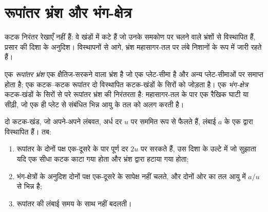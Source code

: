 \section{रूपांतर भ्रंश और भंग-क्षेत्र}

कटक निरंतर रेखाएँ नहीं हैं: वे खंडों में कटे हैं जो उनके समकोण पर चलने वाले भ्रंशों से विस्थापित हैं, प्रसार की दिशा के अनुदिश। विस्थापनों से आगे, भ्रंश महासागर-तल पर लंबे निशानों के रूप में जारी रहते हैं।

\begin{definition}[रूपांतर भ्रंश, भंग-क्षेत्र]\label{def:b1:rifts-ridges-margins:transform}
एक \emph{रूपांतर भ्रंश} एक क्षैतिज-सरकने वाला भ्रंश है जो एक प्लेट-सीमा है और अन्य प्लेट-सीमाओं पर समाप्त होता है; एक कटक–कटक रूपांतर दो विस्थापित कटक-खंडों के सिरों को जोड़ता है। एक \emph{भंग-क्षेत्र} कटक-खंडों के सिरों से परे रूपांतर भ्रंश की निरंतरता है: महासागर-तल के पार एक रैखिक घाटी या सीढ़ी, जो एक ही प्लेट से संबंधित भिन्न आयु के तल को अलग करती है।
\end{definition}

\begin{proposition}\label{prop:b1:rifts-ridges-margins:transform}
दो कटक-खंड, जो अपने-अपने लंबवत, अर्ध दर $u$ पर सममित रूप से फैलते हैं, लंबाई $a$ के एक  द्वारा विस्थापित हैं। तब:
\begin{enumerate}
  \item रूपांतर के दोनों पक्ष एक-दूसरे के पार पूर्ण दर $2u$ पर सरकते हैं, उस दिशा के उल्टे में जो  सुझाता यदि एक सीधा कटक काटा गया होता और भ्रंश द्वारा हटाया गया होता;
  \item भंग-क्षेत्रों के अनुदिश दोनों पक्ष एक-दूसरे के सापेक्ष नहीं चलते, और दोनों ओर का तल आयु में $a/u$ से भिन्न है;
  \item रूपांतर की लंबाई समय के साथ नहीं बदलती।
\end{enumerate}
\end{proposition}

